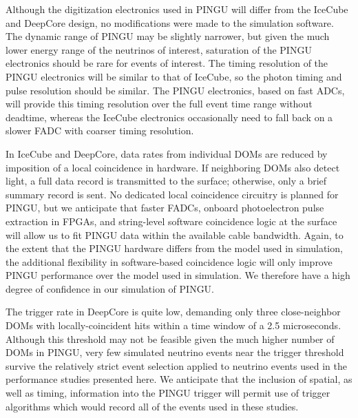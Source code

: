 \documentclass[../Main.tex]{subfiles}
\begin{document}
Although the digitization electronics used in PINGU will differ from
the IceCube and DeepCore design, no modifications were made to the
simulation software.  The dynamic range of PINGU may be slightly
narrower, but given the much lower energy range of the neutrinos of
interest, saturation of the PINGU electronics should be
rare for events of interest.  The timing resolution of the PINGU
electronics will be similar to that of IceCube, so the photon timing and
pulse resolution should be similar.  The PINGU electronics, based on
fast ADCs, will provide this timing resolution over the full event
time range without deadtime, whereas the IceCube electronics
occasionally need to fall back on a slower FADC with coarser timing
resolution.

In IceCube and DeepCore, data rates from individual DOMs are reduced
by imposition of a local coincidence in hardware.  If neighboring DOMs
also detect light, a full data record is transmitted to the surface;
otherwise, only a brief summary record is sent.  No dedicated local
coincidence circuitry is planned for PINGU, but we anticipate that
faster FADCs, onboard photoelectron pulse extraction in FPGAs, and
string-level software coincidence logic at the surface will allow us
to fit PINGU data within the available cable bandwidth.  Again, to the
extent that the PINGU hardware differs from the model used in
simulation, the additional flexibility in software-based coincidence
logic will only improve PINGU performance over the model used in
simulation.  We therefore have a high degree of confidence in our
simulation of PINGU.

The trigger rate in DeepCore is quite low, demanding only
three close-neighbor DOMs with locally-coincident hits within a time
window of a 2.5 microseconds.  Although this threshold may not be
feasible given the much higher number of DOMs in PINGU, very few
simulated neutrino events near the trigger threshold survive the
relatively strict event selection applied to neutrino events used in
the performance studies presented here.  We anticipate that the
inclusion of spatial, as well as timing, information into the PINGU
trigger will permit use of trigger algorithms which would record all
of the events used in these studies.


\end{document}
